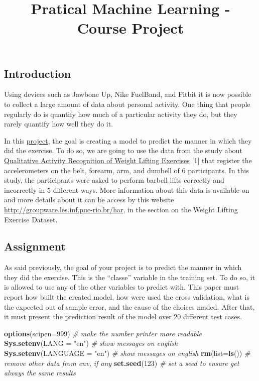 \documentclass[]{article}
\title{Pratical Machine Learning - Course Project}
\author{}
\date{}
\newenvironment{Shaded}{\begin{snugshade}}{\end{snugshade}}
\newcommand{\KeywordTok}[1]{\textcolor[rgb]{0.13,0.29,0.53}{\textbf{#1}}}
\newcommand{\DataTypeTok}[1]{\textcolor[rgb]{0.13,0.29,0.53}{#1}}
\newcommand{\DecValTok}[1]{\textcolor[rgb]{0.00,0.00,0.81}{#1}}
\newcommand{\StringTok}[1]{\textcolor[rgb]{0.31,0.60,0.02}{#1}}
\newcommand{\CommentTok}[1]{\textcolor[rgb]{0.56,0.35,0.01}{\textit{#1}}}
\newcommand{\NormalTok}[1]{#1}
\begin{document}
\maketitle

\subsection{Introduction}\label{introduction}

Using devices such as Jawbone Up, Nike FuelBand, and Fitbit it is now
possible to collect a large amount of data about personal activity. One
thing that people regularly do is quantify how much of a particular
activity they do, but they rarely quantify how well they do it.

In this
\href{https://www.coursera.org/learn/practical-machine-learning/supplement/PvInj/course-project-instructions-read-first}{project},
the goal is creating a model to predict the manner in which they did the
exercise. To do so, we are going to use the data from the study about
\href{http://groupware.les.inf.puc-rio.br/public/papers/2013.Velloso.QAR-WLE.pdf}{Qualitative
Activity Recognition of Weight Lifting Exercises} {[}1{]} that register
the accelerometers on the belt, forearm, arm, and dumbell of 6
participants. In this study, the participants were asked to perform
barbell lifts correctly and incorrectly in 5 different ways. More
information about this data is available on and more details about it
can be access by this website
\url{http://groupware.les.inf.puc-rio.br/har}, in the section on the
Weight Lifting Exercise Dataset.

\subsection{Assignment}\label{assignment}

As said previously, the goal of your project is to predict the manner in
which they did the exercise. This is the ``classe'' variable in the
training set. To do so, it is allowed to use any of the other variables
to predict with. This paper must report how built the created model, how
were used the cross validation, what is the expected out of sample
error, and the cause of the choices maded. After that, it must present
the prediction result of the model over 20 different test cases.

\begin{Shaded}
\begin{Highlighting}[]
\KeywordTok{options}\NormalTok{(}\DataTypeTok{scipen=}\DecValTok{999}\NormalTok{)         }\CommentTok{# make the number printer more readable}
\KeywordTok{Sys.setenv}\NormalTok{(}\DataTypeTok{LANG =} \StringTok{"en"}\NormalTok{)     }\CommentTok{# show messages on english}
\KeywordTok{Sys.setenv}\NormalTok{(}\DataTypeTok{LANGUAGE =} \StringTok{"en"}\NormalTok{) }\CommentTok{# show messages on english}
\KeywordTok{rm}\NormalTok{(}\DataTypeTok{list=}\KeywordTok{ls}\NormalTok{())               }\CommentTok{# remove other data from env, if any}
\KeywordTok{set.seed}\NormalTok{(}\DecValTok{123}\NormalTok{)               }\CommentTok{# set a seed to ensure get always the same results}
\end{Highlighting}
\end{Shaded}
\end{document}
